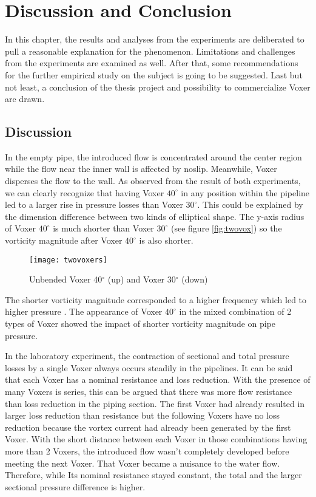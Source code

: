 
\chapter{Discussion and Conclusion}

In this chapter, the results and analyses from the experiments are deliberated to pull a reasonable explanation for the phenomenon. Limitations and challenges from the experiments are examined as well. After that, some recommendations for the further empirical study on the subject is going to be suggested. Last but not least, a conclusion of the thesis project and possibility to commercialize Voxer are drawn.

\section{Discussion}

In the empty pipe, the introduced flow is concentrated around the center region while the flow near the inner wall is affected by \gls{noslip}. Meanwhile, Voxer disperses the flow to the wall. As observed from the result of both experiments, we can clearly recognize that having Voxer $40^{\circ}$ in any position within the pipeline led to a larger rise in pressure losses than Voxer $30^{\circ}$. This could be explained by the dimension difference between two kinds of elliptical shape. The y-axis radius of Voxer $40^{\circ}$ is much shorter than Voxer $30^{\circ}$  (see figure \vref{fig:twovox}) so the vorticity magnitude after Voxer $40^{\circ}$ is also shorter. 
\begin{wrapfigure}{r}{0.4\textwidth}
  \begin{center}
    \texttt{[image: twovoxers]}
  \end{center}
  \caption{Unbended Voxer 40$^{\circ}$ (up) and Voxer 30$^{\circ}$ (down)}
  \label{fig:twovox}
\end{wrapfigure}
The shorter vorticity magnitude corresponded to a higher frequency which led to higher pressure \cite{scz:article}. The appearance of Voxer $40^{\circ}$ in the mixed combination of 2 types of Voxer showed the impact of shorter vorticity magnitude on pipe pressure.

In the laboratory experiment, the contraction of sectional and total pressure losses by a single Voxer always occurs steadily in the pipelines. It can be said that each Voxer has a nominal resistance and loss reduction. With the presence of many Voxers is series, this can be argued that there was more flow resistance than loss reduction in the piping section. The first Voxer had already resulted in larger loss reduction than resistance but the following Voxers have no loss reduction because the vortex current had already been generated by the first Voxer. With the short distance between each Voxer in those combinations having more than 2 Voxers, the introduced flow wasn't completely developed before meeting the next Voxer. That Voxer became a nuisance to the water flow. Therefore, while Its nominal resistance stayed constant, the total and the larger sectional pressure difference is higher. 

